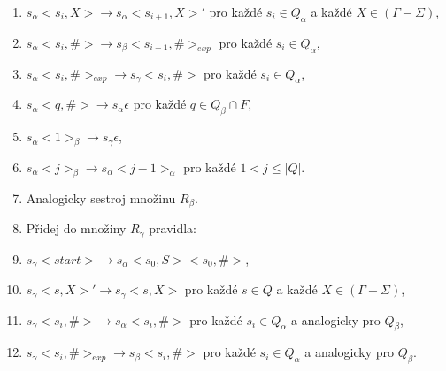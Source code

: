 \begin{Alg}
\begin{list}{}{\setlength\parsep{0cm} \setlength\itemsep{0cm} \setlength\leftmargin{1em}}
\begin{enumerate}
   \item $s_\alpha <s_i, X> \rightarrow s_\alpha <s_{i+1}, X>'$ pro každé $s_i \in Q_\alpha$ a každé $X \in (\Gamma - \Sigma)$,
   \item $s_\alpha <s_i, \#> \rightarrow s_\beta <s_{i+1}, \#>_{exp}$ pro každé $s_i \in Q_\alpha$,
   \item $s_\alpha <s_i, \#>_{exp} \rightarrow s_\gamma <s_{i}, \#>$ pro každé $s_i \in Q_\alpha$,
   \item $s_\alpha <q, \#> \rightarrow s_\alpha \epsilon $ pro každé $q \in Q_\beta \cap F$,
   \item $s_\alpha <1>_{\beta} \rightarrow s_\gamma \epsilon $,
   \item $s_\alpha <j>_{\beta} \rightarrow s_\alpha <j - 1 >_\alpha $ pro každé $1 < j \le |Q|$.


   \item Analogicky sestroj množinu $R_\beta.$ \medskip

   \item Přidej do množiny $R_\gamma$ pravidla:

\renewcommand{\labelenumi}{(\roman{enumi})}

   \item $s_\gamma <start> \rightarrow s_\alpha <s_0, S> <s_0, \#>$,
   \item $s_\gamma <s, X>' \rightarrow s_\gamma <s, X> $ pro každé $s \in Q$ a každé $X \in (\Gamma - \Sigma)$,

   \item $s_\gamma <s_i, \#> \rightarrow s_\alpha <s_i, \#>$ pro každé $s_i \in Q_\alpha$ a analogicky pro $Q_\beta$,
   \item $s_\gamma <s_i, \#>_{exp} \rightarrow s_\beta <s_{i}, \#>$ pro každé $s_i \in Q_\alpha$ a analogicky pro $Q_\beta$.

\end{enumerate}



\end{list}
\end{Alg}


